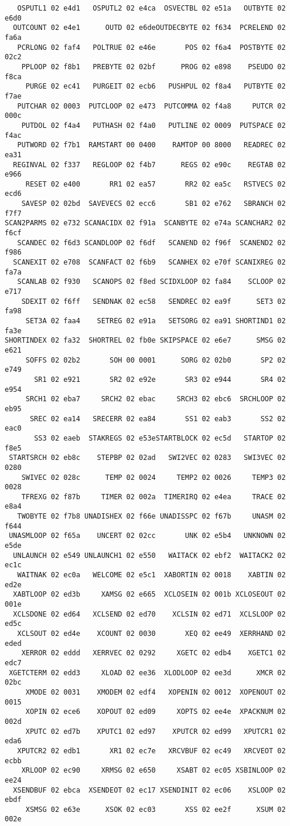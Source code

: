 {\begin{verbatim}
   OSPUTL1 02 e4d1   OSPUTL2 02 e4ca  OSVECTBL 02 e51a   OUTBYTE 02 e6d0
  OUTCOUNT 02 e4e1      OUTD 02 e6deOUTDECBYTE 02 f634  PCRELEND 02 fa6a
   PCRLONG 02 faf4   POLTRUE 02 e46e       POS 02 f6a4  POSTBYTE 02 02c2
    PPLOOP 02 f8b1   PREBYTE 02 02bf      PROG 02 e898    PSEUDO 02 f8ca
     PURGE 02 ec41   PURGEIT 02 ecb6   PUSHPUL 02 f8a4   PUTBYTE 02 f7ae
   PUTCHAR 02 0003  PUTCLOOP 02 e473  PUTCOMMA 02 f4a8     PUTCR 02 000c
    PUTDOL 02 f4a4   PUTHASH 02 f4a0   PUTLINE 02 0009  PUTSPACE 02 f4ac
   PUTWORD 02 f7b1  RAMSTART 00 0400    RAMTOP 00 8000   READREC 02 ea31
  REGINVAL 02 f337   REGLOOP 02 f4b7      REGS 02 e90c    REGTAB 02 e966
     RESET 02 e400       RR1 02 ea57       RR2 02 ea5c   RSTVECS 02 ecd6
    SAVESP 02 02bd  SAVEVECS 02 ecc6       SB1 02 e762   SBRANCH 02 f7f7
SCAN2PARMS 02 e732 SCANACIDX 02 f91a  SCANBYTE 02 e74a SCANCHAR2 02 f6cf
   SCANDEC 02 f6d3 SCANDLOOP 02 f6df   SCANEND 02 f96f  SCANEND2 02 f986
  SCANEXIT 02 e708  SCANFACT 02 f6b9   SCANHEX 02 e70f SCANIXREG 02 fa7a
   SCANLAB 02 f930   SCANOPS 02 f8ed SCIDXLOOP 02 fa84    SCLOOP 02 e717
    SDEXIT 02 f6ff   SENDNAK 02 ec58   SENDREC 02 ea9f      SET3 02 fa98
     SET3A 02 faa4    SETREG 02 e91a   SETSORG 02 ea91 SHORTIND1 02 fa3e
SHORTINDEX 02 fa32  SHORTREL 02 fb0e SKIPSPACE 02 e6e7      SMSG 02 e621
     SOFFS 02 02b2       SOH 00 0001      SORG 02 02b0       SP2 02 e749
       SR1 02 e921       SR2 02 e92e       SR3 02 e944       SR4 02 e954
     SRCH1 02 eba7     SRCH2 02 ebac     SRCH3 02 ebc6  SRCHLOOP 02 eb95
      SREC 02 ea14   SRECERR 02 ea84       SS1 02 eab3       SS2 02 eac0
       SS3 02 eaeb  STAKREGS 02 e53eSTARTBLOCK 02 ec5d   STARTOP 02 f8e5
 STARTSRCH 02 eb8c    STEPBP 02 02ad   SWI2VEC 02 0283   SWI3VEC 02 0280
    SWIVEC 02 028c      TEMP 02 0024     TEMP2 02 0026     TEMP3 02 0028
    TFREXG 02 f87b     TIMER 02 002a  TIMERIRQ 02 e4ea     TRACE 02 e8a4
   TWOBYTE 02 f7b8 UNADISHEX 02 f66e UNADISSPC 02 f67b     UNASM 02 f644
 UNASMLOOP 02 f65a    UNCERT 02 02cc       UNK 02 e5b4   UNKNOWN 02 e5de
  UNLAUNCH 02 e549 UNLAUNCH1 02 e550   WAITACK 02 ebf2  WAITACK2 02 ec1c
   WAITNAK 02 ec0a   WELCOME 02 e5c1  XABORTIN 02 0018    XABTIN 02 ed2e
  XABTLOOP 02 ed3b     XAMSG 02 e665  XCLOSEIN 02 001b XCLOSEOUT 02 001e
  XCLSDONE 02 ed64   XCLSEND 02 ed70    XCLSIN 02 ed71  XCLSLOOP 02 ed5c
   XCLSOUT 02 ed4e    XCOUNT 02 0030       XEQ 02 ee49  XERRHAND 02 eded
    XERROR 02 eddd   XERRVEC 02 0292     XGETC 02 edb4    XGETC1 02 edc7
 XGETCTERM 02 edd3     XLOAD 02 ee36  XLODLOOP 02 ee3d      XMCR 02 02bc
     XMODE 02 0031    XMODEM 02 edf4   XOPENIN 02 0012  XOPENOUT 02 0015
     XOPIN 02 ece6    XOPOUT 02 ed09     XOPTS 02 ee4e  XPACKNUM 02 002d
     XPUTC 02 ed7b    XPUTC1 02 ed97    XPUTCR 02 ed99   XPUTCR1 02 eda6
   XPUTCR2 02 edb1       XR1 02 ec7e   XRCVBUF 02 ec49   XRCVEOT 02 ecbb
    XRLOOP 02 ec90     XRMSG 02 e650     XSABT 02 ec05 XSBINLOOP 02 ee24
  XSENDBUF 02 ebca  XSENDEOT 02 ec17 XSENDINIT 02 ec06    XSLOOP 02 ebdf
     XSMSG 02 e63e      XSOK 02 ec03       XSS 02 ee2f      XSUM 02 002e


\end{verbatim}
}

